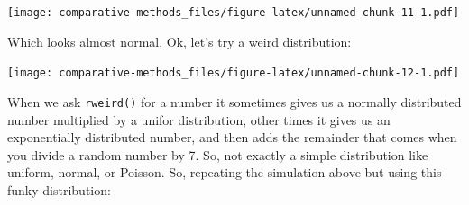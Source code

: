 \documentclass[]{book}
\newenvironment{Shaded}{\begin{snugshade}}{\end{snugshade}}
\newcommand{\KeywordTok}[1]{\textcolor[rgb]{0.13,0.29,0.53}{\textbf{{#1}}}}
\newcommand{\DataTypeTok}[1]{\textcolor[rgb]{0.13,0.29,0.53}{{#1}}}
\newcommand{\DecValTok}[1]{\textcolor[rgb]{0.00,0.00,0.81}{{#1}}}
\newcommand{\FloatTok}[1]{\textcolor[rgb]{0.00,0.00,0.81}{{#1}}}
\newcommand{\StringTok}[1]{\textcolor[rgb]{0.31,0.60,0.02}{{#1}}}
\newcommand{\NormalTok}[1]{{#1}}
\theoremstyle{definition}
\theoremstyle{definition}
\theoremstyle{remark}
\begin{document}
\texttt{[image: comparative-methods\_files/figure-latex/unnamed-chunk-11-1.pdf]}

Which looks almost normal. Ok, let's try a weird distribution:

\begin{Shaded}
\end{Shaded}

\texttt{[image: comparative-methods\_files/figure-latex/unnamed-chunk-12-1.pdf]}

When we ask \texttt{rweird()} for a number it sometimes gives us a
normally distributed number multiplied by a unifor distribution, other
times it gives us an exponentially distributed number, and then adds the
remainder that comes when you divide a random number by 7. So, not
exactly a simple distribution like uniform, normal, or Poisson. So,
repeating the simulation above but using this funky distribution:
\end{document}
